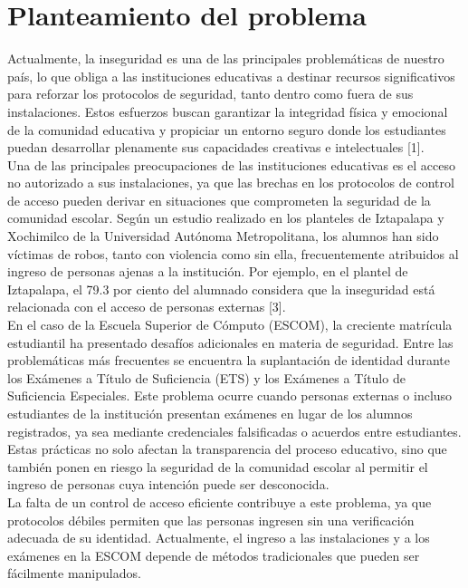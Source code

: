 
\section{Planteamiento del problema}

Actualmente, la inseguridad es una de las principales problemáticas de nuestro país, lo que obliga a las instituciones educativas a destinar recursos significativos para reforzar los protocolos de seguridad, tanto dentro como fuera de sus instalaciones. Estos esfuerzos buscan garantizar la integridad física y emocional de la comunidad educativa y propiciar un entorno seguro donde los estudiantes puedan desarrollar plenamente sus capacidades creativas e intelectuales [1].\\

Una de las principales preocupaciones de las instituciones educativas es el acceso no autorizado a sus instalaciones, ya que las brechas en los protocolos de control de acceso pueden derivar en situaciones que comprometen la seguridad de la comunidad escolar. Según un estudio realizado en los planteles de Iztapalapa y Xochimilco de la Universidad Autónoma Metropolitana, los alumnos han sido víctimas de robos, tanto con violencia como sin ella, frecuentemente atribuidos al ingreso de personas ajenas a la institución. Por ejemplo, en el plantel de Iztapalapa, el 79.3 por ciento del alumnado considera que la inseguridad está relacionada con el acceso de personas externas [3].\\

En el caso de la Escuela Superior de Cómputo (ESCOM), la creciente matrícula estudiantil ha presentado desafíos adicionales en materia de seguridad. Entre las problemáticas más frecuentes se encuentra la suplantación de identidad durante los Exámenes a Título de Suficiencia (ETS) y los Exámenes a Título de Suficiencia Especiales. Este problema ocurre cuando personas externas o incluso estudiantes de la institución presentan exámenes en lugar de los alumnos registrados, ya sea mediante credenciales falsificadas o acuerdos entre estudiantes. Estas prácticas no solo afectan la transparencia del proceso educativo, sino que también ponen en riesgo la seguridad de la comunidad escolar al permitir el ingreso de personas cuya intención puede ser desconocida. \\

La falta de un control de acceso eficiente contribuye a este problema, ya que protocolos débiles permiten que las personas ingresen sin una verificación adecuada de su identidad. Actualmente, el ingreso a las instalaciones y a los exámenes en la ESCOM depende de métodos tradicionales que pueden ser fácilmente manipulados. \\